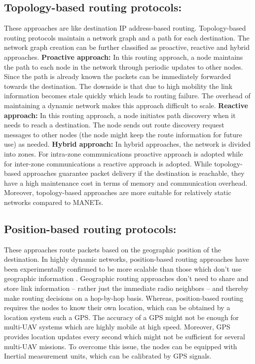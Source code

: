 \subsection{Topology-based routing protocols:}
These approaches are like destination IP address-based routing. Topology-based routing protocols maintain a network graph and a path for each destination. The network graph creation can be further classified as proactive, reactive and hybrid approaches. 
\textbf{Proactive approach:} In this routing approach, a node maintains the path to each node in the network through periodic updates to other nodes. Since the path is already known the packets can be immediately forwarded towards the destination. The downside is that due to high mobility the link information becomes stale quickly which leads to routing failure. The overhead of maintaining a dynamic network makes this approach difficult to scale.
\textbf{Reactive approach:} In this routing approach, a node initiates path discovery when it needs to reach a destination. The node sends out route discovery request messages to other nodes (the node might keep the route information for future use) as needed. 
\textbf{Hybrid approach:} In hybrid approaches, the network is divided into zones. For intra-zone communications proactive approach is adopted while for inter-zone communications a reactive approach is adopted. 
While topology-based approaches guarantee packet delivery if the destination is reachable, they have a high maintenance cost in terms of memory and communication overhead. Moreover, topology-based approaches are more suitable for relatively static networks compared to MANETs.

\subsection{Position-based routing protocols:}
These approaches route packets based on the geographic position of the destination. In highly dynamic networks, position-based routing approaches have been experimentally confirmed to be more scalable than those which don’t use geographic information \cite{Stojmenovic:2002:PRA:2288474.2290160}. Geographic routing approaches don’t need to share and store link information – rather just the immediate radio neighbors – and thereby make routing decisions on a hop-by-hop basis. Whereas, position-based routing requires the nodes to know their own location, which can be obtained by a location system such a GPS. The accuracy of a GPS might not be enough for multi-UAV systems which are highly mobile at high speed. Moreover, GPS provides location updates every second which might not be sufficient for several multi-UAV missions. To overcome this issue, the nodes can be equipped with Inertial measurement units, which can be calibrated by GPS signals.

